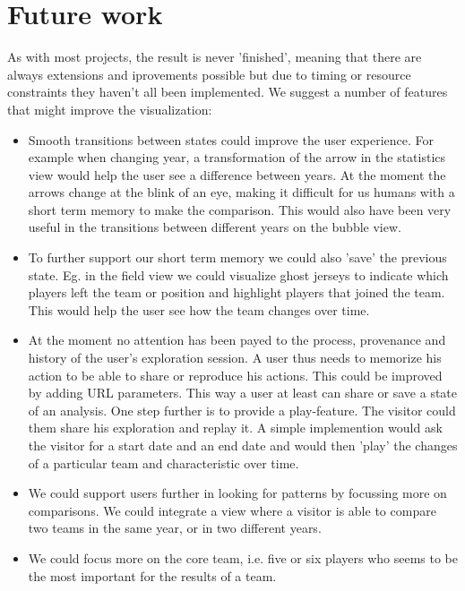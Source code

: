 \documentclass[chi_draft]{sigchi}
\begin{document}
\section{Future work}\label{sec:futurework}
As with most projects, the result is never 'finished', meaning that there are
always extensions and iprovements possible but due to timing or resource constraints they haven't all been implemented. We suggest a number of features that might improve the visualization:
\begin{itemize}
    \item Smooth transitions between states could improve the user experience.
        For example when changing year, a transformation of the arrow in the
        statistics view would help the user see a difference between years.  At
        the moment the arrows change at the blink of an eye, making it difficult
        for us humans with a short term memory to make the comparison. This
        would also have been very useful in the transitions between different
        years on the bubble view.
    \item To further support our short term memory we could also 'save' the
        previous state. Eg. in the field view we could visualize ghost jerseys
        to indicate which players left the team or position and highlight
        players that joined the team.  This would help the user see how the team
        changes over time.
    \item At the moment no attention has been payed to the process, provenance
        and history of the user's exploration session. A user thus needs to
        memorize his action to be able to share or reproduce his actions. This
        could be improved by adding URL parameters. This way a user at least can
        share or save a state of an analysis. One step further is to provide a
        play-feature. The visitor could them share his exploration and replay
        it. A simple implemention would ask the visitor for a start date and an
        end date and would then 'play' the changes of a particular team and
        characteristic over time.
    \item We could support users further in looking for patterns by focussing
        more on comparisons. We could integrate a view where a visitor is able
        to compare two teams in the same year, or in two different years.
    \item We could focus more on the core team, i.e. five or six players who seems 
        to be the most important for the results of a team.
\end{itemize}
\end{document}
